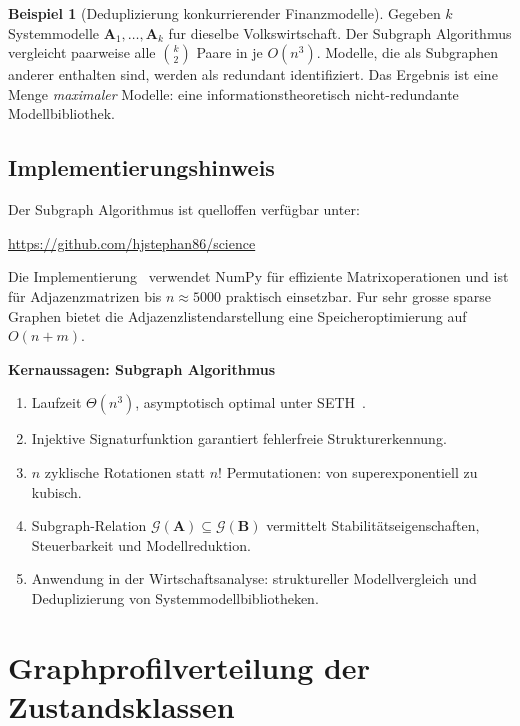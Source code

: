 ﻿\documentclass[12pt, a4paper, titlepage]{report}
\theoremstyle{definition}
\newtheorem{example}[theorem]{Beispiel}
\theoremstyle{remark}
\newcommand{\vA}{\bm{A}}
\newcommand{\vB}{\bm{B}}
\begin{document}
\begin{example}[Deduplizierung konkurrierender Finanzmodelle]
Gegeben $k$ Systemmodelle $\vA_1,\ldots,\vA_k$ fur dieselbe Volkswirtschaft.
Der Subgraph Algorithmus vergleicht paarweise alle $\binom{k}{2}$ Paare in je
$O(n^3)$. Modelle, die als Subgraphen anderer enthalten sind, werden als
redundant identifiziert. Das Ergebnis ist eine Menge \emph{maximaler} Modelle:
eine informationstheoretisch nicht-redundante Modellbibliothek.
\end{example}

\section{Implementierungshinweis}

Der Subgraph Algorithmus ist quelloffen verfügbar unter:
\begin{center}
\url{https://github.com/hjstephan86/science}
\end{center}
Die Implementierung~\citep{epp2026subgraph} verwendet NumPy für effiziente
Matrixoperationen und ist für Adjazenzmatrizen bis $n \approx 5000$ praktisch
einsetzbar. Fur sehr grosse sparse Graphen bietet die Adjazenzlistendarstellung
eine Speicheroptimierung auf $O(n + m)$.

\textbf{Kernaussagen: Subgraph Algorithmus}
\begin{enumerate}[label=(\roman*)]
  \item Laufzeit $\Theta(n^3)$, asymptotisch optimal unter SETH~\citep{epp2026subgraph}.
  \item Injektive Signaturfunktion garantiert fehlerfreie Strukturerkennung.
  \item $n$ zyklische Rotationen statt $n!$ Permutationen: von superexponentiell zu kubisch.
  \item Subgraph-Relation $\mathcal{G}(\vA) \subseteq \mathcal{G}(\vB)$ vermittelt
    Stabilitätseigenschaften, Steuerbarkeit und Modellreduktion.
  \item Anwendung in der Wirtschaftsanalyse: struktureller Modellvergleich und
    Deduplizierung von Systemmodellbibliotheken.
\end{enumerate}

\chapter{Graphprofilverteilung der Zustandsklassen}
\label{sec:graphprofil}
\end{document}
